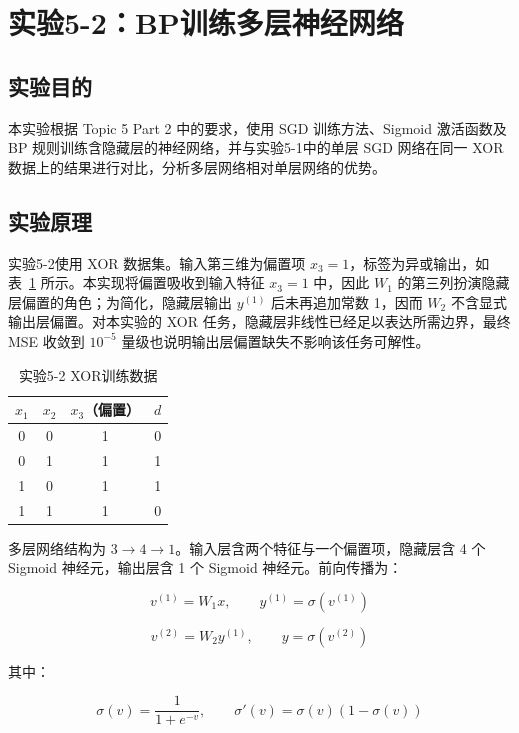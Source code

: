 \documentclass[10.5pt]{config}
\date{\today}
\begin{document}
\makeheader

\section{实验5-2：BP训练多层神经网络}

\subsection{实验目的}

本实验根据 Topic 5 Part 2 中的要求，使用 SGD 训练方法、Sigmoid 激活函数及 BP 规则训练含隐藏层的神经网络，并与实验5-1中的单层 SGD 网络在同一 XOR 数据上的结果进行对比，分析多层网络相对单层网络的优势。

\subsection{实验原理}

实验5-2使用 XOR 数据集。输入第三维为偏置项 $x_3=1$，标签为异或输出，如表~\ref{tab:exp52_data} 所示。本实现将偏置吸收到输入特征 $x_3=1$ 中，因此 $W_1$ 的第三列扮演隐藏层偏置的角色；为简化，隐藏层输出 $y^{(1)}$ 后未再追加常数 1，因而 $W_2$ 不含显式输出层偏置。对本实验的 XOR 任务，隐藏层非线性已经足以表达所需边界，最终 MSE 收敛到 $10^{-5}$ 量级也说明输出层偏置缺失不影响该任务可解性。

\begin{table}[H]
\centering
\begin{tabular}{cccc}
\toprule
$x_1$ & $x_2$ & $x_3$（偏置） & $d$ \\
\midrule
0 & 0 & 1 & 0 \\
0 & 1 & 1 & 1 \\
1 & 0 & 1 & 1 \\
1 & 1 & 1 & 0 \\
\bottomrule
\end{tabular}
\caption{实验5-2 XOR训练数据}
\label{tab:exp52_data}
\end{table}

多层网络结构为 $3\rightarrow4\rightarrow1$。输入层含两个特征与一个偏置项，隐藏层含 4 个 Sigmoid 神经元，输出层含 1 个 Sigmoid 神经元。前向传播为：

\[
v^{(1)}=W_1x,\qquad y^{(1)}=\sigma(v^{(1)})
\]

\[
v^{(2)}=W_2y^{(1)},\qquad y=\sigma(v^{(2)})
\]

其中：

\[
\sigma(v)=\frac{1}{1+e^{-v}},\qquad \sigma'(v)=\sigma(v)(1-\sigma(v))
\]
\end{document}
